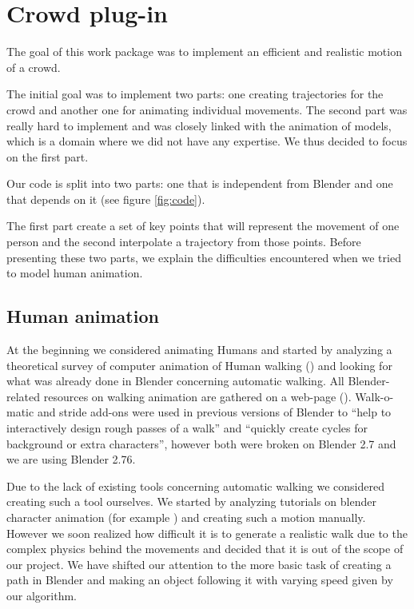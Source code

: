 \section{Crowd plug-in}

The goal of this work package was to implement an efficient and
realistic motion of a crowd.


The initial goal was to implement two parts: one creating trajectories
for the crowd and another one for animating individual movements. The
second part was really hard to implement and was closely linked with
the animation of models, which is a domain where we did not have any
expertise. We thus decided to focus on the first part.


Our code is split into two parts: one that is independent from Blender
and one that depends on it (see figure \ref{fig:code}).


The first part create a set of key points that will represent the
movement of one person and the second interpolate a trajectory from
those points. Before presenting these two parts, we explain the
difficulties encountered when we tried to model human animation.


\subsection{Human animation}

At the beginning we considered animating Humans and started by
analyzing a theoretical survey of computer animation of Human walking
(\cite{th_walking}) and looking for what was already done in Blender
concerning automatic walking. All Blender-related resources on walking
animation are gathered on a web-page
(\cite{blwikiwalking}). Walk-o-matic and stride add-ons were used in
previous versions of Blender to ``help to interactively design rough
passes of a walk'' and ``quickly create cycles for background or extra
characters'', however both were broken on Blender 2.7 and we are using
Blender 2.76.

Due to the lack of existing tools concerning automatic walking we
considered creating such a tool ourselves. We started by analyzing
tutorials on blender character animation (for example
\cite{tuto_walk}) and creating such a motion manually. However we soon
realized how difficult it is to generate a realistic walk due to the
complex physics behind the movements and decided that it is out of the
scope of our project. We have shifted our attention to the more basic
task of creating a path in Blender and making an object following it
with varying speed given by our algorithm.


